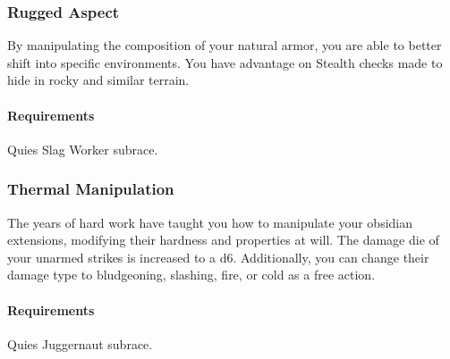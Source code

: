     \subsubsection{Rugged Aspect} \label{feat::ruggedaspect}
        By manipulating the composition of your natural armor, you are able to better shift into specific environments.
        You have advantage on Stealth checks made to hide in rocky and similar terrain.
        \paragraph{Requirements} Quies Slag Worker subrace.
    \subsubsection{Thermal Manipulation} \label{feat::thermalmanipulation}
        The years of hard work have taught you how to manipulate your obsidian extensions, modifying their hardness and properties at will.
        The damage die of your unarmed strikes is increased to a d6.
        Additionally, you can change their damage type to bludgeoning, slashing, fire, or cold as a free action.
        \paragraph{Requirements} Quies Juggernaut subrace.

